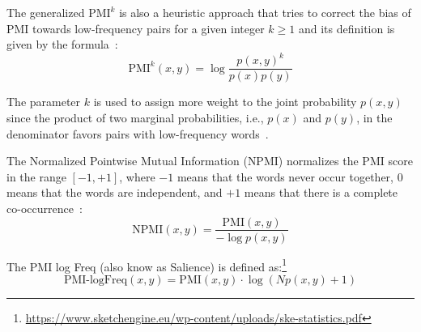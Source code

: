 \largerpage
\begin{definition}
The generalized $\text{PMI}^k$ is also a heuristic approach that tries to correct the bias of PMI 
towards low-frequency pairs for a given integer $k \ge 1$ and its definition is given by the 
formula~\citep{Role2011}:
\[\text{PMI}^{k}(x,y) = \log\frac{p(x,y)^{k}}{p(x)p(y)}\]


\end{definition}

\noindent The parameter $k$ is used to assign more weight to the joint probability $p(x,y)$ since the product of two marginal probabilities, i.e., $p(x)$ and $p(y)$, in the denominator favors pairs with low-frequency words~\citep{Role2011}.

\begin{definition}\sloppy
The Normalized Pointwise Mutual Information ($\text{NPMI}$) normalizes the $\text{PMI}$ score in
the range $[-1,+1]$, where $-1$ means that the words never occur together, $0$ means that the words
are independent, and $+1$ means that there is a complete co-occurrence~\citep{Role2011}:
\[\text{NPMI}(x,y)=\frac{\text{PMI}(x,y)}{-\log p(x,y)}\]
\end{definition}
    
\begin{definition}
The PMI log Freq (also know as Salience) is defined as:\footnote{\url{https://www.sketchengine.eu/wp-content/uploads/ske-statistics.pdf}}
\[\text{PMI-logFreq}(x,y) = \text{PMI}(x,y) \cdot \log (N p(x,y) + 1)\]
\end{definition}

